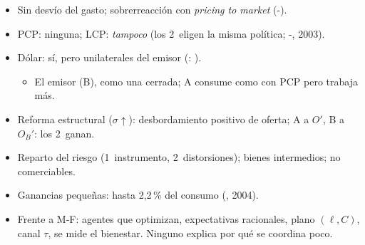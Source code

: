 \documentclass{article}
\begin{document}
\begin{columnas}
\begin{itemize}
  \begin{itemize}
  \item Sin desvío del gasto; sobrerreacción con \emph{pricing to market} (-).
  \end{itemize}
\end{itemize}
\begin{itemize}
\item PCP: ninguna; LCP: \emph{tampoco} (los 2~eligen la misma política; -, 2003).
\item Dólar: sí, pero unilaterales del emisor (: ).
  \begin{itemize}
  \item El emisor (B), como una cerrada; A consume como con PCP pero trabaja más.
  \end{itemize}
\end{itemize}
\begin{itemize}
\item Reforma estructural ($\sigma\uparrow$): desbordamiento positivo de oferta; A a $O'$, B a $O_B'$: los 2~ganan.
\item Reparto del riesgo (1~instrumento, 2~distorsiones); bienes intermedios; no comerciables.
\item Ganancias pequeñas: hasta 2,2\,\% del consumo (, 2004).
\item Frente a M-F: agentes que optimizan, expectativas racionales, plano $(\ell,C)$, canal $\tau$, se mide el bienestar. Ninguno explica por qué se coordina poco.
\end{itemize}


\end{columnas}
\end{document}
